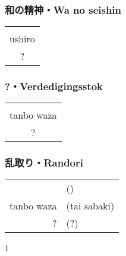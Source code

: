 \subsubsection{和の精神・Wa no seishin}
\begin{table}[H]
\begin{center}
\begin{tabular}{c}
    \ruby{}{}\\
    ushiro\\
    ?
\end{tabular}
\end{center}
\label{kyuu_2_wa_no_seishin}
\end{table}

\subsubsection{?・Verdedigingsstok}
\begin{table}[H]
\begin{center}
\begin{tabular}{c}
    \ruby{}{}\\
    tanbo waza\\
    ?
\end{tabular}
\end{center}
\label{kyuu_2_defense_stick}
\end{table}

\subsubsection{乱取り・Randori}
\begin{table}[H]
\begin{center}
\begin{tabular}{rl}
    \ruby{}{} & (\ruby{}{})\\
    tanbo waza & (tai sabaki)\\
    ? & (?)
\end{tabular}
\end{center}
\label{kyuu_2_randori}
\end{table}
\begin{center}
    1 
\end{center}

